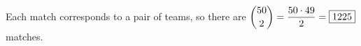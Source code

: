 Each match corresponds to a pair of teams, so there are $\dbinom{50}{2}=\dfrac{50\cdot49}{2}=\boxed{1225}$ matches.
